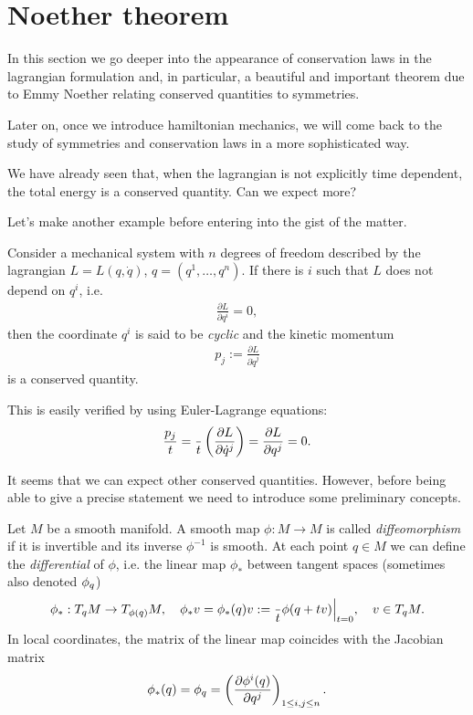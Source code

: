 \documentclass[english,fontsize=11pt,paper=a5,oneside]{scrbook}
\let\d\relax
\DeclareMathOperator{\d}{d}
\theoremstyle{definition}
\newenvironment{example}
  {\pushQED{\qed}\renewcommand{\qedsymbol}{$\lozenge$}\examplex}
  {\popQED\endexamplex}
\begin{document}
\section{Noether theorem}

In this section we go deeper into the appearance of conservation laws in the lagrangian formulation and, in particular, a beautiful and important theorem due to Emmy Noether relating conserved quantities to symmetries.

Later on, once we introduce hamiltonian mechanics, we will come back to the study of symmetries and conservation laws in a more sophisticated way.

We have already seen that, when the lagrangian is not explicitly time dependent, the total energy is a conserved quantity.
Can we expect more?

Let's make another example before entering into the gist of the matter.

\begin{example}[kinetic momentum]\label{ex:linearm}
    Consider a mechanical system with $n$ degrees of freedom described by the lagrangian $L=L(q,\dot q)$, $q=(q^1,\ldots,q^n)$.
    If there is $i$ such that $L$ does not depend on $q^i$, i.e.
    \begin{eqnarray}
        \frac{\partial L}{\partial q^i} = 0,
    \end{eqnarray}
    then the coordinate $q^i$ is said to be \emph{cyclic} and the kinetic momentum
    \begin{eqnarray}
        p_j := \frac{\partial L}{\partial\dot q^j}
    \end{eqnarray}
    is a conserved quantity.

    This is easily verified by using Euler-Lagrange equations:
    \begin{eqnarray}
        \frac{\d p_j}{\d t} =
        \frac{\d}{\d t} \left(\frac{\partial L}{\partial \dot q^j}\right)=
        \frac{\partial L}{\partial q^j} = 0.
    \end{eqnarray}
\end{example}

It seems that we can expect other conserved quantities. However, before being able to give a precise statement we need to introduce some preliminary concepts.

Let $M$ be a smooth manifold. A smooth map $\phi : M \to M$ is called \emph{diffeomorphism} if it is invertible and its inverse $\phi^{-1}$ is smooth. At each point $q\in M$ we can define the \emph{differential} of $\phi$, i.e. the linear map $\phi_*$ between tangent spaces (sometimes also denoted $\d\phi_q$)
\begin{equation}
    \phi_*: T_q M \to T_{\phi(q)} M,
    \quad \phi_* v = \phi_*(q) v := \frac{\d}{\d t} \phi(q + t v) \Big|_{t=0},
    \quad v\in T_q M.
\end{equation}
In local coordinates, the matrix of the linear map coincides with the Jacobian matrix
\begin{equation}
   \phi_*(q) = \d \phi_q = \left(\frac{\partial \phi^i(q)}{\partial q^j}\right)_{1\leq i,j\leq n}.
\end{equation}
\end{document}
